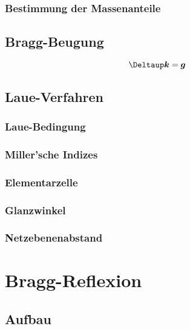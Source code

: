 \subsection{Bestimmung der Massenanteile}

\parencite[„Massenanteilsbestimmung“]{physik412-Anleitung}

\section{Bragg-Beugung}

\parencite[(18.4)]{meschede-gerthsen_24}
\[
    \Deltaup \vec k = \vec g
\]

\section{Laue-Verfahren}

\parencite[P428.5.3, „Auswertung“]{physik412-Anleitung}

\subsection{Laue-Bedingung}

\subsection{Miller'sche Indizes}

\subsection{Elementarzelle}

\subsection{Glanzwinkel}

\subsection{Netzebenenabstand}

\chapter{Bragg-Reflexion}

\section{Aufbau}

